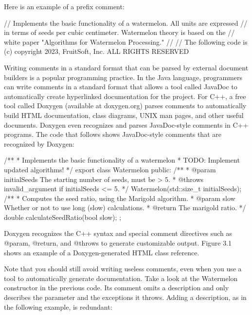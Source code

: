 Here is an example of a prefix comment:

\begin{cpp}
// Implements the basic functionality of a watermelon. All units are expressed
// in terms of seeds per cubic centimeter. Watermelon theory is based on the
// white paper "Algorithms for Watermelon Processing."
//
// The following code is (c) copyright 2023, FruitSoft, Inc. ALL RIGHTS RESERVED
\end{cpp}


Writing comments in a standard format that can be parsed by external document builders is a popular programming practice. In the Java language, programmers can write comments in a standard format that allows a tool called JavaDoc to automatically create hyperlinked documentation for the project. For C++, a free tool called Doxygen (available at doxygen.org) parses comments to automatically build HTML documentation, class diagrams, UNIX man pages, and other useful documents. Doxygen even recognizes and parses JavaDoc-style comments in C++ programs. The code that follows shows JavaDoc-style comments that are recognized by Doxygen:

\begin{cpp}
/**
* Implements the basic functionality of a watermelon
* TODO: Implement updated algorithms!
*/
export class Watermelon
{
    public:
        /**
         * @param initialSeeds The starting number of seeds, must be > 5.
         * @throws invalid_argument if initialSeeds <= 5.
         */
        Watermelon(std::size_t initialSeeds);
        /**
         * Computes the seed ratio, using the Marigold algorithm.
         * @param slow Whether or not to use long (slow) calculations.
         * @return The marigold ratio.
         */
        double calculateSeedRatio(bool slow);
};
\end{cpp}

Doxygen recognizes the C++ syntax and special comment directives such as @param, @return, and @throws to generate customizable output. Figure 3.1 shows an example of a Doxygen-generated HTML class reference.

Note that you should still avoid writing useless comments, even when you use a tool to automatically generate documentation. Take a look at the Watermelon constructor in the previous code. Its comment omits a description and only describes the parameter and the exceptions it throws. Adding a description, as in the following example, is redundant:

